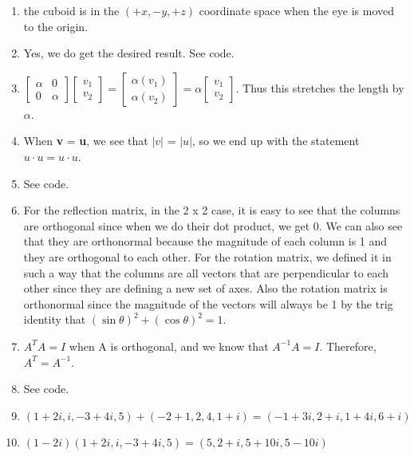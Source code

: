 \documentclass{article}
\begin{document}
\begin{enumerate}
	\item the cuboid is in the $(+x, -y, +z)$ coordinate space when the eye is moved to the origin.
	
	\item Yes, we do get the desired result. See code.
	
	\item $
	\begin{bmatrix}
		\alpha	&0\\
		0	&\alpha
	\end{bmatrix}
	\begin{bmatrix}
		v_1\\
		v_2
	\end{bmatrix}
	= 
	\begin{bmatrix}
		\alpha(v_1)\\
		\alpha(v_2)
	\end{bmatrix}
	= \alpha
	\begin{bmatrix}
		v_1\\
		v_2
	\end{bmatrix}
	$. Thus this stretches the length by $\alpha$. 
	
	\item When \textbf{v} = \textbf{u}, we see that $|v|$ = $|u|$, so we end up with the statement $u \cdot u = u \cdot u$. 
	
	\item See code. 
	
	\item For the reflection matrix, in the 2 x 2 case, it is easy to see that the columns are orthogonal since when we do their dot product, we get 0. We can also see that they are orthonormal because the magnitude of each column is 1 and they are orthogonal to each other. For the rotation matrix, we defined it in such a way that the columns are all vectors that are perpendicular to each other since they are defining a new set of axes. Also the rotation matrix is orthonormal since the magnitude of the vectors will always be 1 by the trig identity that $(\sin{\theta})^2 + (\cos{\theta})^2 = 1$. 
	
	\item $A^TA = I$ when A is orthogonal, and we know that $A^{-1}A = I$. Therefore, $A^T = A^{-1}$.
	
	\item See code.
	
	\item $(1+2i, i, -3+4i, 5) + (-2+1, 2, 4, 1+i) = (-1+3i, 2+i, 1+4i, 6+i)$
	
	\item $(1-2i)(1+2i, i, -3+4i, 5) = (5, 2+i, 5+10i, 5-10i)$
	

\end{enumerate}
\end{document}
